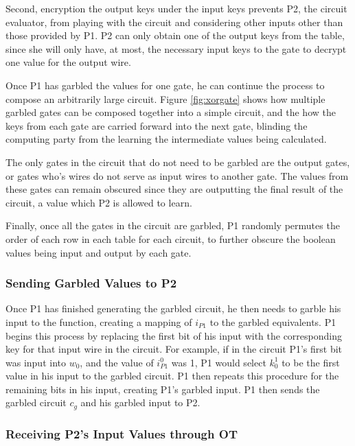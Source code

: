 Second, encryption the output keys under the input keys prevents \ac{P2}, the circuit evaluator, from playing with the circuit and considering other inputs other than those provided by \ac{P1}. \ac{P2} can only obtain one of the output keys from the table, since she will only have, at most, the necessary input keys to the gate to decrypt one value for the output wire.

Once \ac{P1} has garbled the values for one gate, he can continue the process to compose an arbitrarily large circuit.  Figure \ref{fig:xorgate} shows how multiple garbled gates can be composed together into a simple circuit, and the how the keys from each gate are carried forward into the next gate, blinding the computing party from the learning the intermediate values being calculated.

The only gates in the circuit that do not need to be garbled are the output gates, or gates who's wires do not serve as input wires to another gate.  The values from these gates can remain obscured since they are outputting the final result of the circuit, a value which \ac{P2} is allowed to learn.

Finally, once all the gates in the circuit are garbled, \ac{P1} randomly permutes the order of each row in each table for each circuit, to further obscure the boolean values being input and output by each gate.

\subsubsection{Sending Garbled Values to \ac{P2}}

Once \ac{P1} has finished generating the garbled circuit, he then needs to garble his input to the function, creating a mapping of $i_{P1}$ to the garbled equivalents.  \ac{P1} begins this process by replacing the first bit of his input with the corresponding key for that input wire in the circuit.  For example, if in the circuit \ac{P1}'s first bit was input into $w_0$, and the value of $i^0_{P1}$ was 1, \ac{P1} would select $k^1_0$ to be the first value in his input to the garbled circuit. \ac{P1} then repeats this procedure for the remaining bits in his input, creating \ac{P1}'s garbled input. \ac{P1} then sends the garbled circuit $c_g$ and his garbled input to \ac{P2}.

\subsubsection{Receiving \ac{P2}'s Input Values through \ac{OT}}

